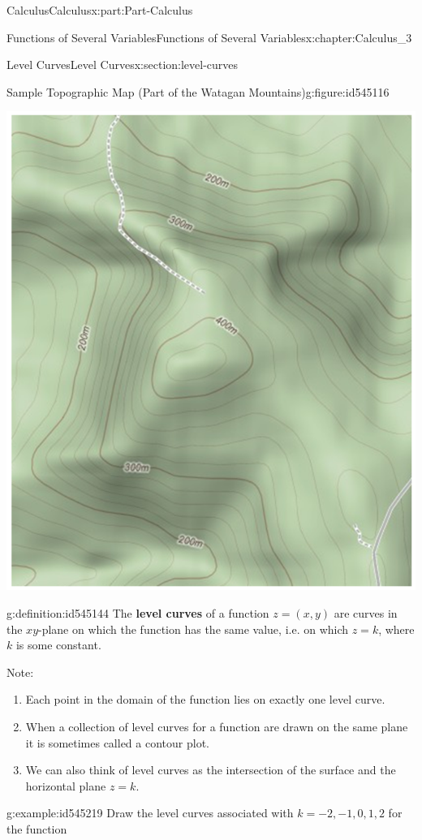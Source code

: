 \documentclass[oneside,10pt,]{book}
\newcommand{\terminology}[1]{\textbf{#1}}
\numberwithin{equation}{section}
\begin{document}
\begin{partptx}{Calculus}{}{Calculus}{}{}{x:part:Part-Calculus}
\begin{chapterptx}{Functions of Several Variables}{}{Functions of Several Variables}{}{}{x:chapter:Calculus_3}
\begin{sectionptx}{Level Curves}{}{Level Curves}{}{}{x:section:level-curves}
\begin{figureptx}{Sample Topographic Map (Part of the Watagan Mountains)}{g:figure:id545116}{}
\begin{image}{0.125}{0.75}{0.125}
\includegraphics[width=\linewidth]{./Calculus/Images/3/2_topographicmap.png}
\end{image}%
\tcblower
\end{figureptx}%
%
\begin{definition}{}{g:definition:id545144}%
The \terminology{level curves} of a function \(z=(x,y)\) are curves in the \(xy\)-plane on which the function has the same value, i.e. on which \(z=k\), where \(k\) is some constant.\end{definition}
Note: %
\begin{enumerate}[label=\arabic*.]
\item{}Each point in the domain of the function lies on exactly one level curve.%
\item{}When a collection of level curves for a function are drawn on the same plane it is sometimes called a contour plot.%
\item{}We can also think of level curves as the intersection of the surface and the horizontal plane \(z=k\).%
\end{enumerate}
%
%
\begin{example}{}{g:example:id545219}%
Draw the level curves associated with \(k=-2,-1,0,1,2\) for the function%

\end{example}
\end{sectionptx}
\end{chapterptx}
\end{partptx}
\end{document}
